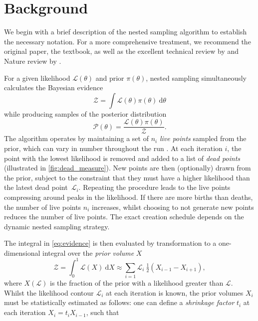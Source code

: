 \documentclass[usenatbib]{mnras}
\newcommand{\nlive}{n_i}
\begin{document}
\section{Background}\label{sec:background}
We begin with a brief description of the nested sampling algorithm to establish the necessary notation. For a more comprehensive treatment, we recommend the original \citep{skilling} paper, the \citet{sivia} textbook, as well as the excellent technical review by \citet{Buchner_2023} and Nature review by \citet{physical_scientists}. 
\par
For a given likelihood $\mathcal{L}(\theta)$ and prior $\pi(\theta)$, nested sampling simultaneously calculates the Bayesian evidence
\begin{equation}\label{eq:evidence}
	\mathcal{Z} = \int \mathcal{L}\left(\theta\right)\pi(\theta)\ \mathrm{d}\theta
\end{equation}
while producing samples of the posterior distribution
\begin{equation}
	\mathcal{P}(\theta) = \frac{\mathcal{L}(\theta) \pi(\theta)}{\mathcal{Z}}.
\end{equation}
The algorithm operates by maintaining a set of $\nlive$ \textit{live points} sampled from the prior, which can vary in number throughout the run \citep{dynamic_ns}. At each iteration $i$, the point with the lowest likelihood is removed and added to a list of \textit{dead points} (illustrated in \cref{fig:dead_measure}). New points are then (optionally) drawn from the prior, subject to the constraint that they must have a higher likelihood than the latest dead point~$\mathcal{L}_i$. Repeating the procedure leads to the live points compressing around peaks in the likelihood. If there are more births than deaths, the number of live points $n_i$ increases, whilst choosing to not generate new points reduces the number of live points. The exact creation schedule depends on the dynamic nested sampling strategy.
\par
The integral in \eqref{eq:evidence} is then evaluated by transformation to a one-dimensional integral over the \textit{prior volume} $X$
\begin{equation}
	\mathcal{Z} = \int_0^1 \mathcal{L}(X)\ \mathrm{d}X \approx \sum_{i=1} \mathcal{L}_i\ \tfrac{1}{2}(X_{i-1}-X_{i+1}),
\end{equation}
where $X(\mathcal{L})$ is the fraction of the prior with a likelihood greater than $\mathcal{L}$. Whilst the likelihood contour $\mathcal{L}_i$ at each iteration is known, the prior volumes $X_i$ must be statistically estimated as follows: one can define a \textit{shrinkage factor} $t_i$ at each iteration $X_{i} = t_i X_{i-1}$, such that
\end{document}
